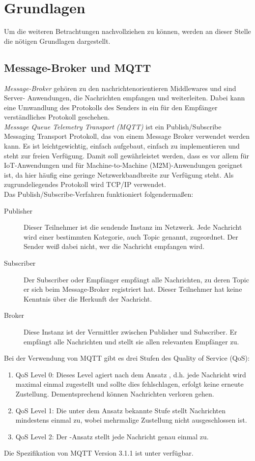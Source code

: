 \chapter{Grundlagen}
Um die weiteren Betrachtungen nachvollziehen zu können, werden an dieser Stelle die nötigen Grundlagen dargestellt.

\section{Message-Broker und MQTT} \label{introMQTT}

\textit{Message-Broker} gehören zu den nachrichtenorientieren Middlewares und sind Server- Anwendungen, die Nachrichten empfangen und weiterleiten. Dabei kann eine Umwandlung des Protokolls des Senders in ein für den Empfänger verständliches Protokoll geschehen. \\
\textit{Message Queue Telemetry Transport (MQTT)} ist ein Publish/Subscribe Messaging Transport Protokoll, das von einem Message Broker verwendet werden kann. Es ist leichtgewichtig, einfach aufgebaut, einfach zu implementieren und steht zur freien Verfügung. Damit soll gewährleistet werden, dass es vor allem für IoT-Anwendungen und für Machine-to-Machine (M2M)-Anwendungen geeignet ist, da hier häufig eine geringe Netzwerkbandbreite zur Verfügung steht. Als zugrundeliegendes Protokoll wird TCP/IP verwendet. \\
Das Publish/Subscribe-Verfahren funktioniert folgendermaßen:
\begin{description}
	\item[Publisher] Dieser Teilnehmer ist die sendende Instanz im Netzwerk. Jede Nachricht wird einer bestimmten Kategorie, auch Topic genannt, zugeordnet. Der Sender weiß dabei nicht, wer die Nachricht empfangen wird.
	\item[Subscriber] Der Subscriber oder Empfänger empfängt alle Nachrichten, zu deren Topic er sich beim Message-Broker registriert hat. Dieser Teilnehmer hat keine Kenntnis über die Herkunft der Nachricht.
	\item[Broker] Diese Instanz ist der Vermittler zwischen Publisher und Subscriber. Er empfängt alle Nachrichten und stellt sie allen relevanten Empfänger zu. 
\end{description}
Bei der Verwendung von MQTT gibt es drei Stufen des Quality of Service (QoS):
\begin{enumerate}
	\item QoS Level 0: Dieses Level agiert nach dem Ansatz , d.h. jede Nachricht wird maximal einmal zugestellt und sollte dies fehlschlagen, erfolgt keine erneute Zustellung. Dementsprechend können Nachrichten verloren gehen.
	\item QoS Level 1: Die unter dem Ansatz  bekannte Stufe stellt Nachrichten mindestens einmal zu, wobei mehrmalige Zustellung nicht ausgeschlossen ist.
	\item QoS Level 2: Der -Ansatz stellt jede Nachricht genau einmal zu.
\end{enumerate}
Die Spezifikation von MQTT Version 3.1.1 ist unter \cite{mqtt_spec} verfügbar.

